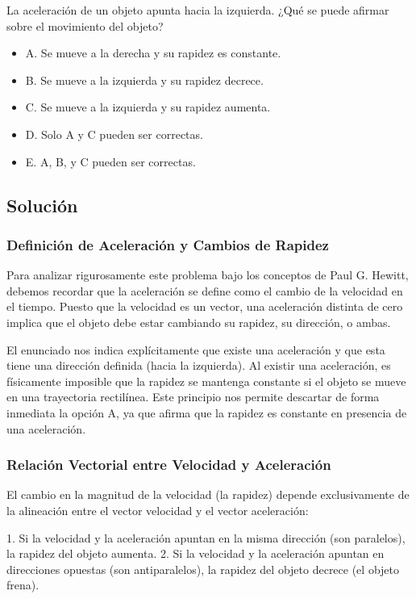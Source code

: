 \documentclass[12pt, a4paper]{article}
\begin{document}
La aceleración de un objeto apunta hacia la izquierda. ¿Qué se puede afirmar sobre el movimiento del objeto?

\begin{itemize}
    \item A. Se mueve a la derecha y su rapidez es constante.
    \item B. Se mueve a la izquierda y su rapidez decrece.
    \item C. Se mueve a la izquierda y su rapidez aumenta.
    \item D. Solo A y C pueden ser correctas.
    \item E. A, B, y C pueden ser correctas.
\end{itemize}

\subsection*{Solución}

\subsubsection*{Definición de Aceleración y Cambios de Rapidez}

Para analizar rigurosamente este problema bajo los conceptos de Paul G. Hewitt, debemos recordar que la aceleración se define como el cambio de la velocidad en el tiempo. Puesto que la velocidad es un vector, una aceleración distinta de cero implica que el objeto debe estar cambiando su rapidez, su dirección, o ambas. 

El enunciado nos indica explícitamente que existe una aceleración y que esta tiene una dirección definida (hacia la izquierda). Al existir una aceleración, es físicamente imposible que la rapidez se mantenga constante si el objeto se mueve en una trayectoria rectilínea. Este principio nos permite descartar de forma inmediata la opción A, ya que afirma que la rapidez es constante en presencia de una aceleración.

\subsubsection*{Relación Vectorial entre Velocidad y Aceleración}

El cambio en la magnitud de la velocidad (la rapidez) depende exclusivamente de la alineación entre el vector velocidad y el vector aceleración:

1. Si la velocidad y la aceleración apuntan en la misma dirección (son paralelos), la rapidez del objeto aumenta.
2. Si la velocidad y la aceleración apuntan en direcciones opuestas (son antiparalelos), la rapidez del objeto decrece (el objeto frena).
\end{document}
